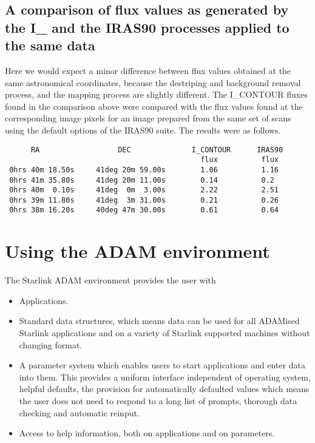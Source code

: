 \subsection{A comparison of flux values as generated by the I\_ and the IRAS90
processes applied to the same data}
Here we would expect a minor difference between flux values obtained at the
same astronomical coordinates, because the destriping and background removal
process, and the mapping process are slightly different.
The I\_CONTOUR fluxes found in the comparison above were compared with the flux
values found at the corresponding image pixels for an image prepared  from the 
same set of scans using the default options of the IRAS90 suite. The results
were as follows.
\begin{small}
\begin{verbatim}
      RA                  DEC              I_CONTOUR      IRAS90
                                             flux          flux
 0hrs 40m 18.50s     41deg 20m 59.00s        1.06          1.16        
 0hrs 41m 35.80s     41deg 20m 11.00s        0.14          0.2
 0hrs 40m  0.10s     41deg  0m  3.00s        2.22          2.51
 0hrs 39m 11.80s     41deg  3m 31.00s        0.21          0.26
 0hrs 38m 16.20s     40deg 47m 30.00s        0.61          0.64
\end{verbatim}
\end{small}

\section{Using the ADAM environment
\label{m:useadam}}

The Starlink ADAM environment provides the user with
\begin{itemize}
\item Applications.
\item Standard data structures, which means data can be used for all
ADAMised Starlink applications and on a variety of Starlink supported machines
without changing format.
\item A parameter system which enables users to start applications and enter
data into them. This provides a uniform interface independent of operating
system, helpful defaults, the provision for automatically defaulted values which
means the user does not need to respond to a long list of prompts, thorough data
checking and automatic reinput.
\item Access to help information, both on applications and on parameters.
\end{itemize}


